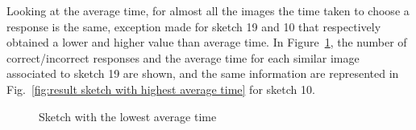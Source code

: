 %
\noindent Looking at the average time, for almost all the images the time taken to choose a response is the same, exception made for sketch \num{19} and \num{10} that respectively obtained a lower and higher value than average time. In Figure~\ref{fig:result sketch with lowest average time}, the number of correct/incorrect responses and the average time for each similar image associated to sketch \num{19} are shown, and the same information are represented in Fig.~\ref{fig:result sketch with highest average time} for sketch \num{10}.\\
\begin{figure}[!ht]
    \centering
     \quad
    \caption{Sketch with the lowest average time}
    \label{fig:result sketch with lowest average time}
\end{figure}
